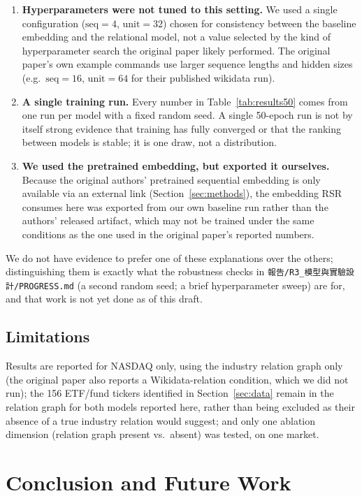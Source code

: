 \documentclass[11pt]{article}
\begin{document}
\begin{enumerate}
  \item \textbf{Hyperparameters were not tuned to this setting.} We used a single configuration
  ($\text{seq}=4$, $\text{unit}=32$) chosen for consistency between the baseline embedding and the
  relational model, not a value selected by the kind of hyperparameter search the original paper
  likely performed. The original paper's own example commands use larger sequence lengths and
  hidden sizes (e.g.\ $\text{seq}=16$, $\text{unit}=64$ for their published wikidata run).
  \item \textbf{A single training run.} Every number in Table~\ref{tab:results50} comes from one
  run per model with a fixed random seed. A single 50-epoch run is not by itself strong evidence
  that training has fully converged or that the ranking between models is stable; it is one draw,
  not a distribution.
  \item \textbf{We used the pretrained embedding, but exported it ourselves.} Because the
  original authors' pretrained sequential embedding is only available via an external link
  (Section~\ref{sec:methods}), the embedding RSR consumes here was exported from our own baseline
  run rather than the authors' released artifact, which may not be trained under the same
  conditions as the one used in the original paper's reported numbers.
\end{enumerate}

We do not have evidence to prefer one of these explanations over the others; distinguishing them
is exactly what the robustness checks in \texttt{報告/R3\_模型與實驗設計/PROGRESS.md} (a second
random seed; a brief hyperparameter sweep) are for, and that work is not yet done as of this
draft.

\subsection{Limitations}

Results are reported for NASDAQ only, using the industry relation graph only (the original paper
also reports a Wikidata-relation condition, which we did not run); the 156 ETF/fund tickers
identified in Section~\ref{sec:data} remain in the relation graph for both models reported here,
rather than being excluded as their absence of a true industry relation would suggest; and only
one ablation dimension (relation graph present vs.\ absent) was tested, on one market.

\section{Conclusion and Future Work}
\label{sec:conclusion}
\end{document}
